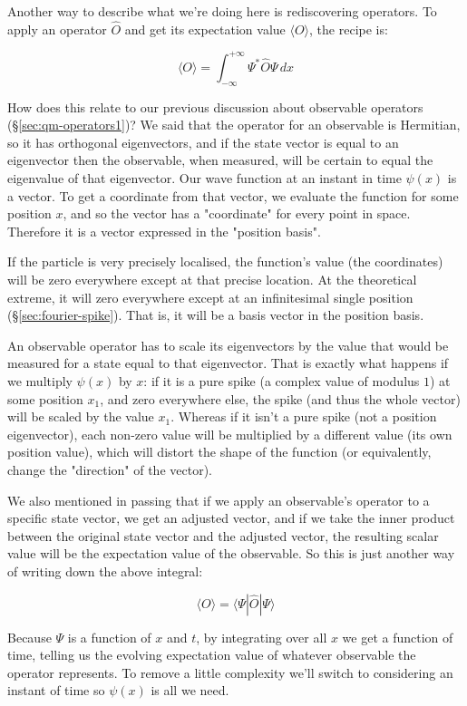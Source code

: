 Another way to describe what we're doing here is rediscovering operators. To apply an operator $\hat{O}$ and get its expectation value $\langle O \rangle$, the recipe is:

$$
\langle O \rangle =
\int_{-\infty}^{+\infty}
\Psi^*
\hat{O}
\Psi
\,dx
$$

How does this relate to our previous discussion about observable operators (§\ref{sec:qm-operators1})? We said that the operator for an observable is Hermitian, so it has orthogonal eigenvectors, and if the state vector is equal to an eigenvector then the observable, when measured, will be certain to equal the eigenvalue of that eigenvector. Our wave function at an instant in time $\psi(x)$ is a vector. To get a coordinate from that vector, we evaluate the function for some position $x$, and so the vector has a "coordinate" for every point in space. Therefore it is a vector expressed in the "position basis".

If the particle is very precisely localised, the function's value (the coordinates) will be zero everywhere except at that precise location. At the theoretical extreme, it will zero everywhere except at an infinitesimal single position (§\ref{sec:fourier-spike}). That is, it will be a basis vector in the position basis.

An observable operator has to scale its eigenvectors by the value that would be measured for a state equal to that eigenvector. That is exactly what happens if we multiply $\psi(x)$ by $x$: if it is a pure spike (a complex value of modulus $1$) at some position $x_1$, and zero everywhere else, the spike (and thus the whole vector) will be scaled by the value $x_1$. Whereas if it isn't a pure spike (not a position eigenvector), each non-zero value will be multiplied by a different value (its own position value), which will distort the shape of the function (or equivalently, change the "direction" of the vector).

We also mentioned in passing that if we apply an observable's operator to a specific state vector, we get an adjusted vector, and if we take the inner product between the original state vector and the adjusted vector, the resulting scalar value will be the expectation value of the observable. So this is just another way of writing down the above integral:

$$
\langle O \rangle =
\langle \Psi| \hat{O} | \Psi \rangle
$$

Because $\Psi$ is a function of $x$ and $t$, by integrating over all $x$ we get a function of time, telling us the evolving expectation value of whatever observable the operator represents. To remove a little complexity we'll switch to considering an instant of time so $\psi(x)$ is all we need.

